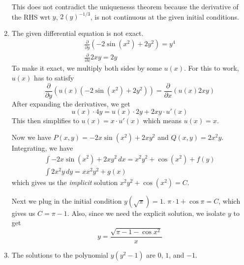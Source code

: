 \documentclass[12pt]{article}
\begin{document}
\begin{enumerate}
          This does not contradict the uniquenesss theorem because the derivative
          of the RHS wrt $y$, $2(y)^{-1/3}$, is not continuous at the given initial conditions.
    \item The given differential equation is not exact.
    \begin{gather*}
        \frac{\partial}{\partial y} \left(-2 \sin \left(x^2\right)+2y^2\right)=y^4 \\
        \frac{\partial}{\partial x} 2xy=2y
    \end{gather*}
    To make it exact, we multiply both sides by some $u(x)$.
    For this to work, $u(x)$ has to satisfy
    \[\frac{\partial}{\partial y}(u(x)\left(-2\sin \left(x^2\right) +2y^2\right))=\frac{\partial}{\partial x} (u(x) 2xy)\]
    After expanding the derivatives, we get
    \[u(x) \cdot 4y= u(x) \cdot 2y+ 2xy \cdot u'(x)\]
    This then simplifies to $u(x)=x \cdot u'(x)$ which means $u(x)=x$.

    Now we have $P(x,y)=-2x\sin\left(x^2\right)+2xy^2$ and $Q(x,y)=2x^2y$.
    Integrating, we have
    \begin{gather*}
        \int -2x\sin\left(x^2\right)+2xy^2\,dx=x^2y^2+\cos\left(x^2\right)+f(y) \\
        \int 2x^2y\,dy=xx^2y^2+g(x)
    \end{gather*}
    which gives us the \textit{implicit} solution $x^2y^2+\cos\left(x^2\right)=C$.

    Next we plug in the initial condition $y(\sqrt \pi)=1$.
    $\pi \cdot 1+ \cos \pi=C$, which gives us $C=\pi-1$.
    Also, since we need the explicit solution, we isolate $y$ to get
    \[\boxed{y=\frac{\sqrt{\pi-1-\cos x^2}}{x}}\]
    \item The solutions to the polynomial $y(y^2-1)$ are $0$, $1$, and $-1$.


\end{enumerate}
\end{document}
